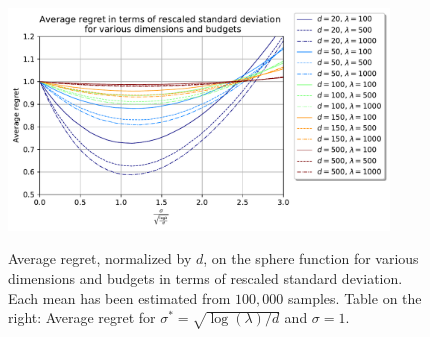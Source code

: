 %
\begin{figure}[t]
    \centering
    \begin{minipage}{0.72\textwidth}
        \centering
        \includegraphics[width=0.90\textwidth]{sections/appendix/ppsn2020-rescaling/figures/rescaling_sphere.pdf} %
        \caption{Average regret, normalized by $d$, on the sphere function for various dimensions and budgets in terms of rescaled standard deviation. Each mean has been estimated from $100,000$ samples. Table on the right: Average regret for $\sigma^*=\sqrt{\log(\lambda)/d}$ and $\sigma=1$.}
        \label{valsphere}
    \end{minipage}\hfill
    \begin{minipage}{0.25\textwidth}
           {\footnotesize{
        \centering
    }}
    \end{minipage}
\end{figure}
